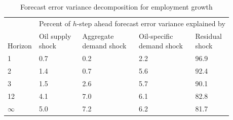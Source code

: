 \begin{table}

\caption{\label{tab:fevd} Forecast error variance decomposition for employment growth}
\centering
\begin{tabular}[t]{lllll}
\toprule
\multicolumn{1}{c}{ } & \multicolumn{4}{c}{Percent of $h$-step ahead forecast error variance explained by} \\
\cmidrule(l{3pt}r{3pt}){2-5}
\makecell[l]{\\Horizon} & \makecell[l]{Oil supply\\shock} & \makecell[l]{Aggregate\\demand shock} & \makecell[l]{Oil-specific\\demand shock} & \makecell[l]{Residual\\shock}\\
\midrule
1 & 0.7 & 0.2 & 2.2 & 96.9\\
2 & 1.4 & 0.7 & 5.6 & 92.4\\
3 & 1.5 & 2.6 & 5.7 & 90.1\\
12 & 4.1 & 7.0 & 6.1 & 82.8\\
$\infty$ & 5.0 & 7.2 & 6.2 & 81.7\\
\bottomrule
\end{tabular}
\end{table}
